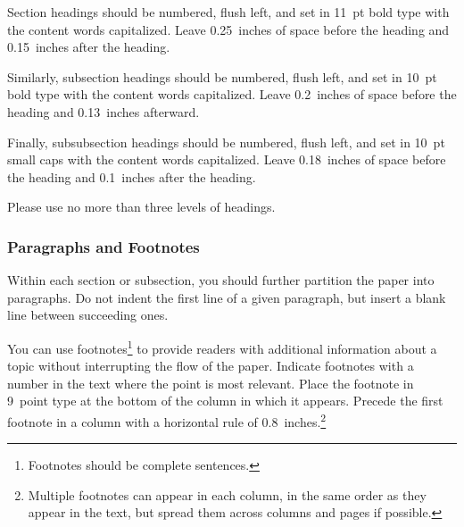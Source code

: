 \documentclass{article}
\theoremstyle{plain}
\theoremstyle{definition}
\theoremstyle{remark}
\begin{document}
Section headings should be numbered, flush left, and set in 11~pt bold
type with the content words capitalized. Leave 0.25~inches of space
before the heading and 0.15~inches after the heading.

Similarly, subsection headings should be numbered, flush left, and set
in 10~pt bold type with the content words capitalized. Leave
0.2~inches of space before the heading and 0.13~inches afterward.

Finally, subsubsection headings should be numbered, flush left, and
set in 10~pt small caps with the content words capitalized. Leave
0.18~inches of space before the heading and 0.1~inches after the
heading.

Please use no more than three levels of headings.

\subsubsection{Paragraphs and Footnotes}

Within each section or subsection, you should further partition the
paper into paragraphs. Do not indent the first line of a given
paragraph, but insert a blank line between succeeding ones.

You can use footnotes\footnote{Footnotes
should be complete sentences.} to provide readers with additional
information about a topic without interrupting the flow of the paper.
Indicate footnotes with a number in the text where the point is most
relevant. Place the footnote in 9~point type at the bottom of the
column in which it appears. Precede the first footnote in a column
with a horizontal rule of 0.8~inches.\footnote{Multiple footnotes can
appear in each column, in the same order as they appear in the text,
but spread them across columns and pages if possible.}
\end{document}
